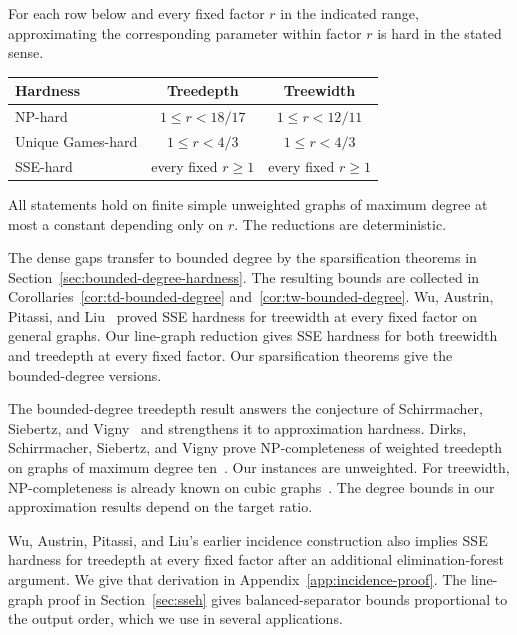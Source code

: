 \begin{theorem}
\label{thm:main-results}
For each row below and every fixed factor $r$ in the indicated
range, approximating the corresponding parameter within factor $r$
is hard in the stated sense.
\begin{center}
\begin{tabular}{lcc}
\toprule
\textup{Hardness} & \textup{Treedepth} & \textup{Treewidth}\\
\midrule
\textup{NP-hard} & $1\leq r<18/17$ & $1\leq r<12/11$\\
\textup{Unique Games-hard} & $1\leq r<4/3$ & $1\leq r<4/3$\\
\textup{SSE-hard} & \textup{every fixed }$r\geq1$
                & \textup{every fixed }$r\geq1$\\
\bottomrule
\end{tabular}
\end{center}
All statements hold on finite simple unweighted graphs of maximum
degree at most a constant depending only on $r$. The reductions are
deterministic.
\end{theorem}

The dense gaps transfer to bounded degree by the sparsification
theorems in Section~\ref{sec:bounded-degree-hardness}. The resulting
bounds are collected in Corollaries~\ref{cor:td-bounded-degree}
and~\ref{cor:tw-bounded-degree}. Wu, Austrin, Pitassi, and
Liu~\cite[Theorem~1.1]{APW} proved \textup{SSE} hardness for treewidth at
every fixed factor on general graphs. Our line-graph reduction gives
\textup{SSE} hardness for both treewidth and treedepth at every fixed factor.
Our sparsification theorems give the bounded-degree versions.

The bounded-degree treedepth result answers the conjecture of
Schirrmacher, Siebertz, and Vigny~\cite[Conjecture~1]{SchirrmacherSiebertzVigny2025}
and strengthens it to approximation hardness. Dirks, Schirrmacher,
Siebertz, and Vigny prove
\textup{NP}-completeness of weighted treedepth on graphs of maximum degree
ten~\cite{DirksEtAl2025Weighted}. Our instances are unweighted.
For treewidth, \textup{NP}-completeness is already known on cubic
graphs~\cite{BodlaenderEtAl2023Cubic}. The degree bounds in our
approximation results depend on the target ratio.

Wu, Austrin, Pitassi, and Liu's earlier incidence construction also
implies \textup{SSE} hardness for treedepth at every fixed factor after an
additional elimination-forest argument. We give that derivation in
Appendix~\ref{app:incidence-proof}.
The line-graph proof in Section~\ref{sec:sseh} gives balanced-separator
bounds proportional to the output order, which we use in several
applications.

